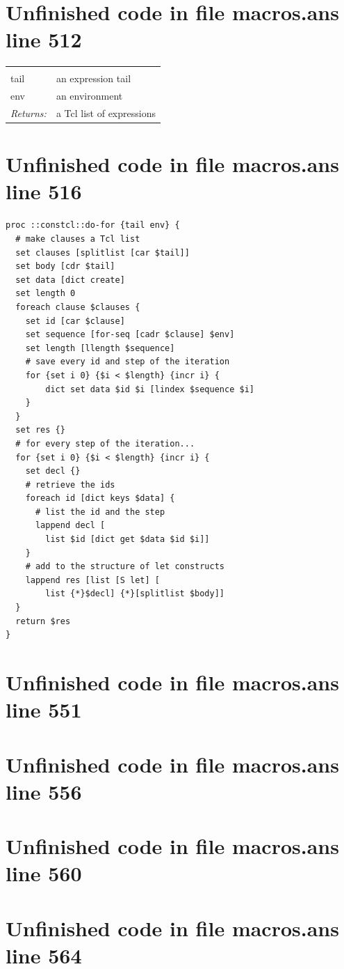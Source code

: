 \documentclass[twoside,9pt]{report}
\begin{document}
\section{Unfinished code in file macros.ans line 512}
\noindent\begin{tabular}{ |p{1.9cm} p{8cm}| }
\hline
\rowcolor[HTML]{CCCCCC} \multicolumn{2}{|l|}{\bf do-for (internal)} \\
tail & an expression tail \\
env & an environment \\
\textit{Returns:} & a Tcl list of expressions \\
\hline
\end{tabular}
\section{Unfinished code in file macros.ans line 516}
\begin{lstlisting}
proc ::constcl::do-for {tail env} {
  # make clauses a Tcl list
  set clauses [splitlist [car $tail]]
  set body [cdr $tail]
  set data [dict create]
  set length 0
  foreach clause $clauses {
    set id [car $clause]
    set sequence [for-seq [cadr $clause] $env]
    set length [llength $sequence]
    # save every id and step of the iteration
    for {set i 0} {$i < $length} {incr i} {
        dict set data $id $i [lindex $sequence $i]
    }
  }
  set res {}
  # for every step of the iteration...
  for {set i 0} {$i < $length} {incr i} {
    set decl {}
    # retrieve the ids
    foreach id [dict keys $data] {
      # list the id and the step
      lappend decl [
        list $id [dict get $data $id $i]]
    }
    # add to the structure of let constructs
    lappend res [list [S let] [
        list {*}$decl] {*}[splitlist $body]]
  }
  return $res
}
\end{lstlisting}
\section{Unfinished code in file macros.ans line 551}
\section{Unfinished code in file macros.ans line 556}
\section{Unfinished code in file macros.ans line 560}
\section{Unfinished code in file macros.ans line 564}
\end{document}
